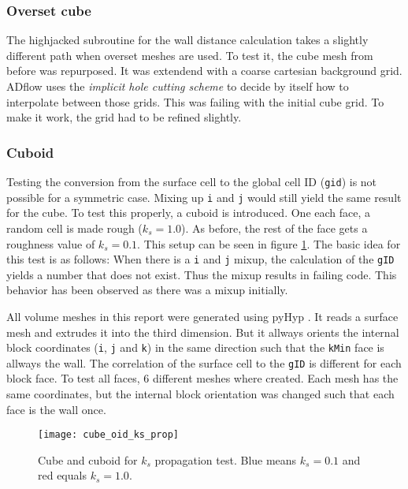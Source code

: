 \subsubsection{Overset cube}
The highjacked subroutine for the wall distance calculation takes a slightly
different path when overset meshes are used. To test it, the cube mesh from
before was repurposed. It was extendend with a coarse cartesian  background
grid.  ADflow uses the \textit{implicit hole cutting scheme} to decide by itself
how to interpolate between those grids. This was failing with the initial
cube grid. To make it work, the grid had to be refined slightly.

\subsubsection{Cuboid}
Testing the conversion from the surface cell to the global cell ID
(\texttt{gid}) is not possible for a symmetric case. Mixing up \texttt{i} and
\texttt{j} would still yield the same result for the cube. To test this
properly, a cuboid is introduced. One each face, a random cell is made rough
($k_{s} = 1.0$). As before, the rest of the face gets a roughness value of
$k_{s} = 0.1$. This setup can be seen in figure \ref{fig:cube_oid_ks_prop}.
The basic idea for this test is as follows: When there is a \texttt{i} and
\texttt{j} mixup, the calculation of the \texttt{gID} yields a number that does
not exist. Thus the mixup results in failing code. This behavior has been
observed as there was a mixup initially.

All volume meshes in this report were generated using pyHyp \cite{Secco2021}. It
reads a surface mesh and extrudes it into the third dimension. But it allways
orients the internal block coordinates (\texttt{i}, \texttt{j} and \texttt{k})
in the same direction such that the \texttt{kMin} face is allways the wall. The
correlation of the surface cell to the \texttt{gID} is different for each block
face. To test all faces, 6 different meshes where created. Each mesh has the
same coordinates, but the internal block orientation was changed such that each
face is the wall once.

\begin{figure}[H] \centering
\texttt{[image: cube\_oid\_ks\_prop]}
    \caption{Cube and cuboid for $k_{s}$ propagation test. Blue means
$k_{s} = 0.1$ and red equals $k_{s} =1.0$.}
    \label{fig:cube_oid_ks_prop}
\end{figure}

